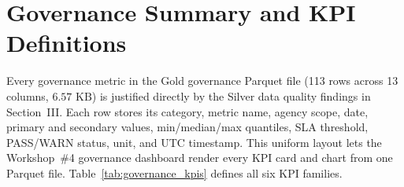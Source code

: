 \section{Governance Summary and KPI Definitions}

Every governance metric in the Gold governance Parquet file (113 rows across 13 columns, $6.57\text{ KB}$) is justified directly by the Silver data quality findings in Section~III. Each row stores its category, metric name, agency scope, date, primary and secondary values, min/median/max quantiles, SLA threshold, PASS/WARN status, unit, and UTC timestamp. This uniform layout lets the Workshop~\#4 governance dashboard render every KPI card and chart from one Parquet file. Table~\ref{tab:governance_kpis} defines all six KPI families.

